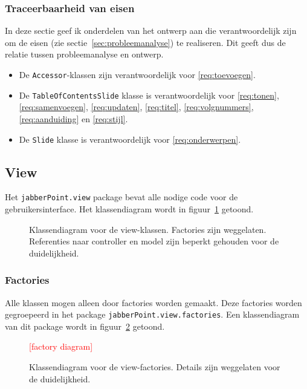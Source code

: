 \documentclass[a4paper]{article}
\newcommand{\todo}[1]{\textcolor{red}{[#1]}\\}
\newcommand{\reqref}[1]{\ref{req:#1}}
\newcommand{\code}[1]{\lstinline[columns=fixed]{#1}}
\newcommand{\diagram}[3][1.3]{
	\begin{figure}[!htb]
	 \caption{#3}
	 \label{diagram:#2}
	 \makebox[\textwidth][c]{\texttt{[image: Diagrams/\#2.pdf]}}%
	\end{figure}
}
\begin{document}
    \subsubsection{Traceerbaarheid van eisen}
        In deze sectie geef ik onderdelen van het ontwerp aan die verantwoordelijk zijn om de eisen (zie sectie~\ref{sec:probleemanalyse}) te realiseren.
        Dit geeft dus de relatie tussen probleemanalyse en ontwerp.

        \begin{itemize}
            \item De \code{Accessor}-klassen zijn verantwoordelijk voor \reqref{toevoegen}.
            \item De \code{TableOfContentsSlide} klasse is verantwoordelijk voor \reqref{tonen}, \reqref{samenvoegen},
                \reqref{updaten}, \reqref{titel}, \reqref{volgnummers}, \reqref{aanduiding} en \reqref{stijl}.
            \item De \code{Slide} klasse is verantwoordelijk voor \reqref{onderwerpen}.
        \end{itemize}

	\subsection{View}
		Het \code{jabberPoint.view} package bevat alle nodige code voor de gebruikersinterface.
		Het klassendiagram wordt in figuur~\ref{diagram:view} getoond.

		\diagram[1]{view}{
			Klassendiagram voor de view-klassen.
			Factories zijn weggelaten.
			Referenties naar controller en model zijn beperkt gehouden voor de duidelijkheid.
		}

		\subsubsection{Factories}
			Alle klassen mogen alleen door factories worden gemaakt.
			Deze factories worden gegroepeerd in het package \code{jabberPoint.view.factories}.
			Een klassendiagram van dit package wordt in figuur~\ref{diagram:view-factories} getoond.

			\begin{figure}[!htb]
			 \caption{
				Klassendiagram voor de view-factories.\label{diagram:view-factories}
				Details zijn weggelaten voor de duide\-lijk\-heid.
			 }
			 \todo{factory diagram} %
			\end{figure}
\end{document}
